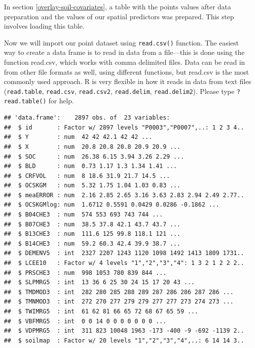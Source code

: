 \documentclass[10pt,b5paper,]{book}
\newenvironment{Shaded}{\begin{snugshade}}{\end{snugshade}}
\newcommand{\CommentTok}[1]{\textcolor[rgb]{0.56,0.35,0.01}{\textit{#1}}}
\newcommand{\KeywordTok}[1]{\textcolor[rgb]{0.13,0.29,0.53}{\textbf{#1}}}
\newcommand{\NormalTok}[1]{#1}
\newcommand{\OperatorTok}[1]{\textcolor[rgb]{0.81,0.36,0.00}{\textbf{#1}}}
\newcommand{\StringTok}[1]{\textcolor[rgb]{0.31,0.60,0.02}{#1}}
\theoremstyle{definition}
\theoremstyle{definition}
\theoremstyle{definition}
\theoremstyle{remark}
\begin{document}
In section \ref{overlay-soil-covariates}, a table with the points values
after data preparation and the values of our spatial predictors was
prepared. This step involves loading this table.

Now we will import our point dataset using \texttt{read.csv()} function.
The easiest way to create a data frame is to read in data from a
file---this is done using the function read.csv, which works with comma
delimited files. Data can be read in from other file formats as well,
using different functions, but read.csv is the most commonly used
approach. R is very flexible in how it reads in data from text files
(\texttt{read.table}, \texttt{read.csv}, \texttt{read.csv2},
\texttt{read.delim}, \texttt{read.delim2}). Please type
\texttt{?read.table()} for help.

\begin{Shaded}
\end{Shaded}

\begin{verbatim}
## 'data.frame':    2897 obs. of  23 variables:
##  $ id       : Factor w/ 2897 levels "P0003","P0007",..: 1 2 3 4..
##  $ Y        : num  42 42 42.1 42 42 ...
##  $ X        : num  20.8 20.8 20.8 20.9 20.9 ...
##  $ SOC      : num  26.38 6.15 3.94 3.26 2.29 ...
##  $ BLD      : num  0.73 1.17 1.3 1.34 1.41 ...
##  $ CRFVOL   : num  8 18.6 31.9 21.7 14.5 ...
##  $ OCSKGM   : num  5.32 1.75 1.04 1.03 0.83 ...
##  $ meaERROR : num  2.16 2.85 2.65 3.16 3.63 2.83 2.94 2.49 2.77..
##  $ OCSKGMlog: num  1.6712 0.5591 0.0429 0.0286 -0.1862 ...
##  $ B04CHE3  : num  574 553 693 743 744 ...
##  $ B07CHE3  : num  38.5 37.8 42.1 43.7 43.7 ...
##  $ B13CHE3  : num  111.6 125 99.8 118.1 121 ...
##  $ B14CHE3  : num  59.2 60.3 42.4 39.9 38.7 ...
##  $ DEMENV5  : int  2327 2207 1243 1120 1098 1492 1413 1809 1731..
##  $ LCEE10   : Factor w/ 4 levels "1","2","3","4": 1 3 2 1 2 2 2..
##  $ PRSCHE3  : num  998 1053 780 839 844 ...
##  $ SLPMRG5  : int  13 36 6 25 30 24 15 17 20 43 ...
##  $ TMDMOD3  : int  282 280 285 288 289 287 286 286 287 286 ...
##  $ TMNMOD3  : int  272 270 277 279 279 277 277 273 274 273 ...
##  $ TWIMRG5  : int  61 62 81 66 65 72 68 67 65 59 ...
##  $ VBFMRG5  : int  0 0 14 0 0 0 0 0 0 0 ...
##  $ VDPMRG5  : int  311 823 10048 1963 -173 -400 -9 -692 -1139 2..
##  $ soilmap  : Factor w/ 20 levels "1","2","3","4",..: 6 14 14 3..
\end{verbatim}
\end{document}
